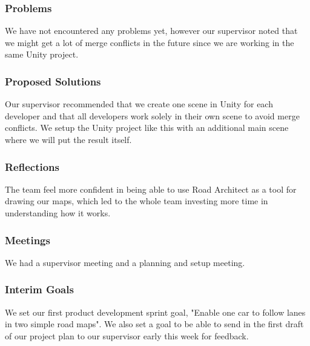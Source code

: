 \subsubsection{Problems}
    We have not encountered any problems yet, however our supervisor noted that we might get a lot of merge conflicts in the future since we are working in the same Unity project.

\subsubsection{Proposed Solutions}
    Our supervisor recommended that we create one scene in Unity for each developer and that all developers work solely in their own scene to avoid merge conflicts. We setup the Unity project like this with an additional main scene where we will put the result itself.

\subsubsection{Reflections}
    The team feel more confident in being able to use Road Architect as a tool for drawing our maps, which led to the whole team investing more time in understanding how it works. 

\subsubsection{Meetings}
    We had a supervisor meeting and a planning and setup meeting. 

\subsubsection{Interim Goals}
    We set our first product development sprint goal, "Enable one car to follow lanes in two simple road maps". We also set a goal to be able to send in the first draft of our project plan to our supervisor early this week for feedback. 

